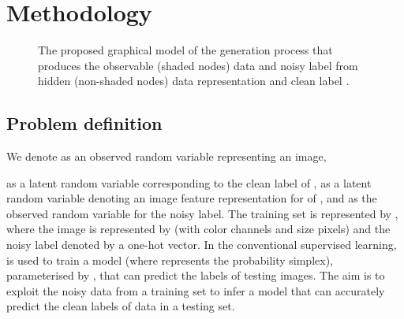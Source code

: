 \documentclass[10pt,twocolumn,letterpaper]{article}
\begin{document}
     \section{Methodology}

\label{sec:methodology}

    \begin{figure}[t]
        \centering
        \caption{The proposed graphical model of the generation process that produces the observable (shaded nodes) data  and noisy label  from hidden (non-shaded nodes) data representation  and clean label .}
        \label{fig:graphical_model}
    \end{figure}


    \subsection{Problem definition}
    \label{sec:background}
        We denote 
        as an observed random variable representing an image, 
        
        as a latent random variable corresponding to the clean label of ,
         as a latent random variable denoting an image feature representation for of , and  as the observed random variable for the noisy label.
        The training set is represented by , where 
        the image is represented by  (with  color channels and size  pixels) and the noisy label  denoted by a one-hot vector.
In the conventional supervised learning,  is used to train a model  (where  represents the probability simplex), parameterised by , that can predict the labels of testing images. 
The aim is to exploit the noisy data  from a training set to infer a model  that can accurately predict the clean labels  of data in a testing set.
\end{document}

